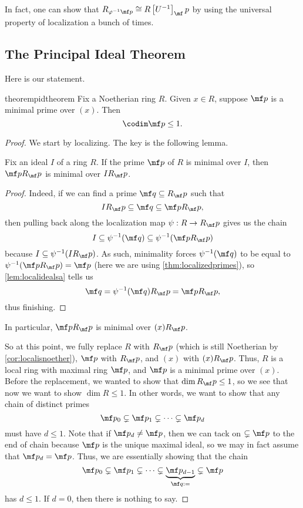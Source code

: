 \begin{remark}
	In fact, one can show that $R_{\varphi^{-1}\mf p}\cong R\left[U^{-1}\right]_\mf p$ by using the universal property of localization a bunch of times.
\end{remark}

\subsection{The Principal Ideal Theorem}
Here is our statement.
\begin{restatable}{theorem}{pidtheorem} \label{thm:pit1}
	Fix a Noetherian ring $R$. Given $x\in R$, suppose $\mf p$ is a minimal prime over $(x)$. Then
	\[\codim\mf p\le1.\]
\end{restatable}
\begin{proof}
	We start by localizing. The key is the following lemma.
	\begin{lemma} \label{lem:localminimal}
		Fix an ideal $I$ of a ring $R$. If the prime $\mf p$ of $R$ is minimal over $I$, then $\mf pR_\mf p$ is minimal over $IR_\mf p$.
	\end{lemma}
	\begin{proof}
		Indeed, if we can find a prime $\mf q\subseteq R_\mf p$ such that
		\[IR_\mf p\subseteq\mf q\subseteq\mf pR_\mf p,\]
		then pulling back along the localization map $\psi:R\to R_\mf p$ gives us the chain
		\[I\subseteq\psi^{-1}(\mf q)\subseteq\psi^{-1}(\mf pR_\mf p)\]
		because $I\subseteq\psi^{-1}(IR_\mf p)$. As such, minimality forces $\psi^{-1}(\mf q)$ to be equal to $\psi^{-1}(\mf pR_\mf p)=\mf p$ (here we are using \autoref{thm:localizedprimes}), so \autoref{lem:localidealsa} tells us
		\[\mf q=\psi^{-1}(\mf q)R_\mf p=\mf pR_\mf p,\]
		thus finishing.
	\end{proof}
	In particular, $\mf pR_\mf p$ is minimal over $(x)R_\mf p$.

	So at this point, we fully replace $R$ with $R_\mf p$ (which is still Noetherian by \autoref{cor:localisnoether}), $\mf p$ with $R_\mf p$, and $(x)$ with $(x)R_\mf p$. Thus, $R$ is a local ring with maximal ring $\mf p$, and $\mf p$ is a minimal prime over $(x)$. Before the replacement, we wanted to show that $\dim R_\mf p\le1$, so we see that now we want to show $\dim R\le1$. In other words, we want to show that any chain of distinct primes
	\[\mf p_0\subsetneq\mf p_1\subsetneq\cdots\subsetneq\mf p_d\]
	must have $d\le1$. Note that if $\mf p_d\ne\mf p$, then we can tack on $\subsetneq\mf p$ to the end of chain because $\mf p$ is the unique maximal ideal, so we may in fact assume that $\mf p_d=\mf p$. Thus, we are essentially showing that the chain
	\[\mf p_0\subsetneq\mf p_1\subsetneq\cdots\subsetneq\underbrace{\mf p_{d-1}}_{\mf q:=}\subsetneq\mf p\]
	has $d\le1$. If $d=0$, then there is nothing to say.
	

\end{proof}
